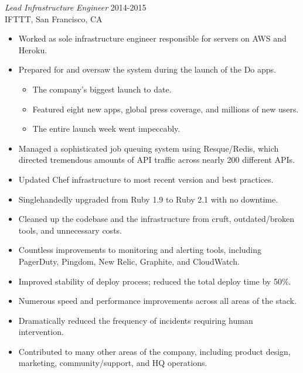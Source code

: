 \documentclass[line,margin]{res}
\begin{document}
\begin{resume}
  {\sl Lead Infrastructure Engineer}  \hfill 2014-2015 \\
  IFTTT,
  San Francisco, CA
  \begin{itemize}  \itemsep -2pt %
    \item Worked as sole infrastructure engineer responsible for servers on AWS and Heroku.
    \item Prepared for and oversaw the system during the launch of the Do apps.
 
    \vspace{-2.5mm} %
    \begin{itemize}  \itemsep -3pt %
      \item The company's biggest launch to date.
      \item Featured eight new apps, global press coverage, and millions of new users. 
      \item The entire launch week went impeccably.
    \end{itemize}
    \vspace{-2.0mm} %

    \item Managed a sophisticated job queuing system using Resque/Redis, which directed tremendous amounts of API traffic across nearly 200 different APIs.
    \item Updated Chef infrastructure to most recent version and best practices.
    \item Singlehandedly upgraded from Ruby 1.9 to Ruby 2.1 with no downtime.
    \item Cleaned up the codebase and the infrastructure from cruft, outdated/broken tools, and unnecessary costs.
    \item Countless improvements to monitoring and alerting tools, including PagerDuty, Pingdom, New Relic, Graphite, and CloudWatch.
    \item Improved stability of deploy process; reduced the total deploy time by 50\%.
    \item Numerous speed and performance improvements across all areas of the stack.
    \item Dramatically reduced the frequency of incidents requiring human intervention.
    \item Contributed to many other areas of the company, including product design, marketing, community/support, and HQ operations.
  \end{itemize}


\end{resume}
\end{document}

